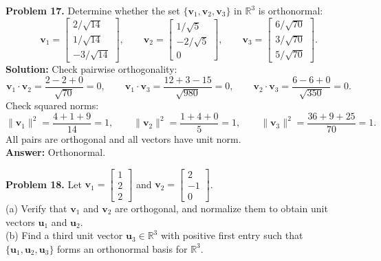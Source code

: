 \documentclass[11pt, letterpaper]{article}
\theoremstyle{definition}
\theoremstyle{remark}
\begin{document}
\textbf{Problem 17.} Determine whether the set $\{\mathbf{v}_1, \mathbf{v}_2, \mathbf{v}_3\}$ in $\mathbb{R}^3$ is orthonormal:
\[
\mathbf{v}_1 = \begin{bmatrix} 2/\sqrt{14} \\ 1/\sqrt{14} \\ -3/\sqrt{14} \end{bmatrix}, \qquad
\mathbf{v}_2 = \begin{bmatrix} 1/\sqrt{5} \\ -2/\sqrt{5} \\ 0 \end{bmatrix}, \qquad
\mathbf{v}_3 = \begin{bmatrix} 6/\sqrt{70} \\ 3/\sqrt{70} \\ 5/\sqrt{70} \end{bmatrix}.
\]
\textbf{Solution:} Check pairwise orthogonality:
\[
\mathbf{v}_1 \cdot \mathbf{v}_2 = \frac{2 - 2 + 0}{\sqrt{70}} = 0, \qquad
\mathbf{v}_1 \cdot \mathbf{v}_3 = \frac{12 + 3 - 15}{\sqrt{980}} = 0, \qquad
\mathbf{v}_2 \cdot \mathbf{v}_3 = \frac{6 - 6 + 0}{\sqrt{350}} = 0.
\]
Check squared norms:
\[
\|\mathbf{v}_1\|^2 = \frac{4 + 1 + 9}{14} = 1, \qquad
\|\mathbf{v}_2\|^2 = \frac{1 + 4 + 0}{5} = 1, \qquad
\|\mathbf{v}_3\|^2 = \frac{36 + 9 + 25}{70} = 1.
\]
All pairs are orthogonal and all vectors have unit norm. \\
\textbf{Answer:} Orthonormal.

\textbf{Problem 18.} Let $\mathbf{v}_1 = \begin{bmatrix} 1 \\ 2 \\ 2 \end{bmatrix}$ and $\mathbf{v}_2 = \begin{bmatrix} 2 \\ -1 \\ 0 \end{bmatrix}$. \\
(a) Verify that $\mathbf{v}_1$ and $\mathbf{v}_2$ are orthogonal, and normalize them to obtain unit vectors $\mathbf{u}_1$ and $\mathbf{u}_2$. \\
(b) Find a third unit vector $\mathbf{u}_3 \in \mathbb{R}^3$ with positive first entry such that $\{\mathbf{u}_1, \mathbf{u}_2, \mathbf{u}_3\}$ forms an orthonormal basis for $\mathbb{R}^3$.
\end{document}
